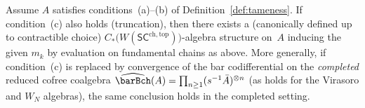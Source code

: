 \begin{theorem}
\label{thm:rectification}
Assume $A$ satisfies conditions~\textup{(a)--(b)} of Definition~\ref{def:tameness}. If condition~\textup{(c)} also holds (truncation), then there exists a (canonically defined up to contractible choice) $C_\ast\!\bigl(W(\mathsf{SC}^{\mathrm{ch,top}})\bigr)$-algebra structure on~$A$ inducing the given $m_k$ by evaluation on fundamental chains as above. More generally, if condition~\textup{(c)} is replaced by convergence of the bar codifferential on the \emph{completed} reduced cofree coalgebra $\widehat{\barBch}(A)=\prod_{n\ge1}(s^{-1}\bar A)^{\otimes n}$ (as holds for the Virasoro and $W_N$ algebras), the same conclusion holds in the completed setting.
\end{theorem}

